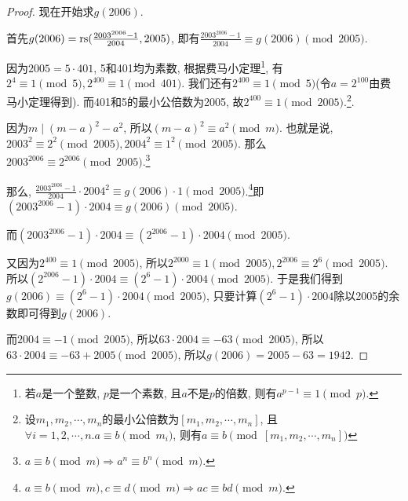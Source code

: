 \begin{proof}
    现在开始求$g(2006)$.

    首先$g(2006)=\mathrm{rs}(\frac{2003^{2006}-1}{2004}, 2005)$, 即有$\frac{2003^{2006}-1}{2004}\equiv g(2006)\pmod{2005}$.

    因为$2005=5\cdot 401$, 5和401均为素数, 根据费马小定理\footnote{若$a$是一个整数, $p$是一个素数, 且$a$不是$p$的倍数, 则有$a^{p-1}\equiv 1\pmod{p}.$}, 有$2^4\equiv 1\pmod{5},2^{400}\equiv 1\pmod{401}$. 我们还有$2^{400}\equiv 1\pmod{5}$(令$a=2^{100}$由费马小定理得到). 而401和5的最小公倍数为2005, 故$2^{400}\equiv 1\pmod{2005}$.\footnote{设$m_1,m_2,\cdots,m_n$的最小公倍数为$[m_1,m_2,\cdots,m_n]$, 且$\forall i=1,2,\cdots,n. a\equiv b\pmod{m_i}$, 则有$a\equiv b\pmod{[m_1,m_2,\cdots,m_n]}$}.

    因为$m\mid(m-a)^2-a^2$, 所以$(m-a)^2 \equiv a^2\pmod{m}$. 也就是说, $2003^2\equiv 2^2\pmod{2005},2004^2\equiv 1^2\pmod{2005}$. 那么$2003^{2006}\equiv 2^{2006}\pmod{2005}$.\footnote{$a\equiv b\pmod{m}\Rightarrow a^n\equiv b^n\pmod{m}$.} 

    那么, $\frac{2003^{2006}-1}{2004}\cdot 2004^2 \equiv g(2006)\cdot 1\pmod{2005}$.\footnote{$a\equiv b\pmod{m},c\equiv d\pmod{m}\Rightarrow ac\equiv bd\pmod{m}.$}即$(2003^{2006}-1)\cdot 2004\equiv g(2006)\pmod{2005}$.

    而$(2003^{2006}-1)\cdot 2004\equiv (2^{2006}-1)\cdot 2004\pmod{2005}$.

    又因为$2^{400}\equiv 1\pmod{2005}$, 所以$2^{2000}\equiv 1\pmod{2005}, 2^{2006}\equiv 2^6\pmod{2005}$. 所以$(2^{2006}-1)\cdot 2004\equiv (2^6-1)\cdot 2004 \pmod{2005}$. 于是我们得到$g(2006)\equiv (2^6-1)\cdot 2004\pmod{2005}$, 只要计算$(2^6-1)\cdot 2004$除以2005的余数即可得到$g(2006)$.

    而$2004\equiv -1\pmod{2005}$, 所以$63\cdot 2004\equiv -63\pmod{2005}$, 所以$63\cdot 2004\equiv -63+2005\pmod{2005}$, 所以$g(2006)= 2005 - 63 = 1942$.

\end{proof}